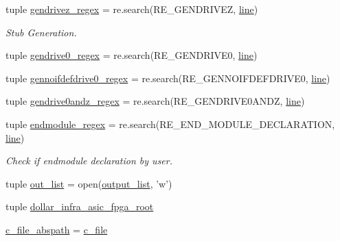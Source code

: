 \begin{DoxyCompactItemize}
\item 
tuple \hyperlink{namespaceveripy_a188398590a71f5e7c68337fd92a67bf7}{gendrivez\-\_\-regex} = re.\-search(R\-E\-\_\-\-G\-E\-N\-D\-R\-I\-V\-E\-Z, \hyperlink{namespaceveripy_a3cf9cf94513841f0d65d3081b08a55cc}{line})
\begin{DoxyCompactList}\small\item\em Stub Generation. \end{DoxyCompactList}\item 
tuple \hyperlink{namespaceveripy_aa2af1923077c3d88816ed1449896be05}{gendrive0\-\_\-regex} = re.\-search(R\-E\-\_\-\-G\-E\-N\-D\-R\-I\-V\-E0, \hyperlink{namespaceveripy_a3cf9cf94513841f0d65d3081b08a55cc}{line})
\item 
tuple \hyperlink{namespaceveripy_ad9ca8c35b0ba3500e52cbaefc381ee77}{gennoifdefdrive0\-\_\-regex} = re.\-search(R\-E\-\_\-\-G\-E\-N\-N\-O\-I\-F\-D\-E\-F\-D\-R\-I\-V\-E0, \hyperlink{namespaceveripy_a3cf9cf94513841f0d65d3081b08a55cc}{line})
\item 
tuple \hyperlink{namespaceveripy_a6882cd46af143e35f1d53de0c5961049}{gendrive0andz\-\_\-regex} = re.\-search(R\-E\-\_\-\-G\-E\-N\-D\-R\-I\-V\-E0\-A\-N\-D\-Z, \hyperlink{namespaceveripy_a3cf9cf94513841f0d65d3081b08a55cc}{line})
\item 
tuple \hyperlink{namespaceveripy_ac385a661e564ea21a74143edbc147bb9}{endmodule\-\_\-regex} = re.\-search(R\-E\-\_\-\-E\-N\-D\-\_\-\-M\-O\-D\-U\-L\-E\-\_\-\-D\-E\-C\-L\-A\-R\-A\-T\-I\-O\-N, \hyperlink{namespaceveripy_a3cf9cf94513841f0d65d3081b08a55cc}{line})
\begin{DoxyCompactList}\small\item\em Check if endmodule declaration by user. \end{DoxyCompactList}\item 
tuple \hyperlink{namespaceveripy_a3c87219c0df570bcd1bebb41ee3c4adc}{out\-\_\-list} = open(\hyperlink{namespaceveripy_aa6ea69d7177eeedc80f2e1c1ff8b00f6}{output\-\_\-list}, 'w')
\item 
tuple \hyperlink{namespaceveripy_a20c975857dc6d80de2866942e40e05f5}{dollar\-\_\-infra\-\_\-asic\-\_\-fpga\-\_\-root}
\item 
\hyperlink{namespaceveripy_a53d32cc2c5a71562b7e9d2414bca5ccf}{c\-\_\-file\-\_\-abspath} = \hyperlink{namespaceveripy_aeec698b4635f08372de56311378d1526}{c\-\_\-file}
\end{DoxyCompactItemize}


